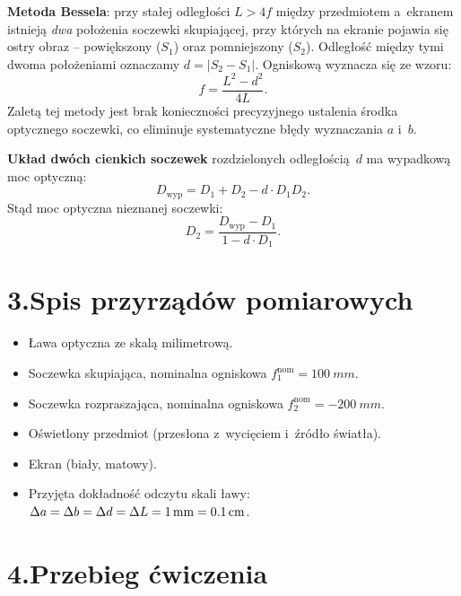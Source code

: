 \documentclass[a4paper,12pt]{article}
\begin{document}
\textbf{Metoda Bessela}: przy stałej odległości $L > 4f$ między przedmiotem a~ekranem
istnieją \emph{dwa} położenia soczewki skupiającej, przy których na ekranie pojawia się
ostry obraz -- powiększony ($S_1$) oraz pomniejszony ($S_2$). Odległość między tymi
dwoma położeniami oznaczamy $d = |S_2 - S_1|$. Ogniskową wyznacza się ze wzoru:
\begin{equation}
  f = \frac{L^2 - d^2}{4L}.
  \label{eq:bessela}
\end{equation}
Zaletą tej metody jest brak konieczności precyzyjnego ustalenia środka optycznego
soczewki, co eliminuje systematyczne błędy wyznaczania $a$ i~$b$.

\textbf{Układ dwóch cienkich soczewek} rozdzielonych odległością~$d$ ma wypadkową moc
optyczną:
\begin{equation}
  D_\text{wyp} = D_1 + D_2 - d \cdot D_1 D_2.
  \label{eq:uklad}
\end{equation}
Stąd moc optyczna nieznanej soczewki:
\begin{equation}
  D_2 = \frac{D_\text{wyp} - D_1}{1 - d \cdot D_1}.
  \label{eq:D2}
\end{equation}

\section*{3.\quad Spis przyrządów pomiarowych}

\begin{itemize}
  \item Ława optyczna ze skalą milimetrową.
  \item Soczewka skupiająca, nominalna ogniskowa $f_1^{\text{nom}} = \SI{100}{mm}$.
  \item Soczewka rozpraszająca, nominalna ogniskowa $f_2^{\text{nom}} = \SI{-200}{mm}$.
  \item Oświetlony przedmiot (przesłona z~wycięciem i~źródło światła).
  \item Ekran (biały, matowy).
  \item Przyjęta dokładność odczytu skali ławy: $\Delta a = \Delta b = \Delta d =
        \Delta L = \SI{1}{mm} = \SI{0{,}1}{cm}$.
\end{itemize}

\section*{4.\quad Przebieg ćwiczenia}
\end{document}
